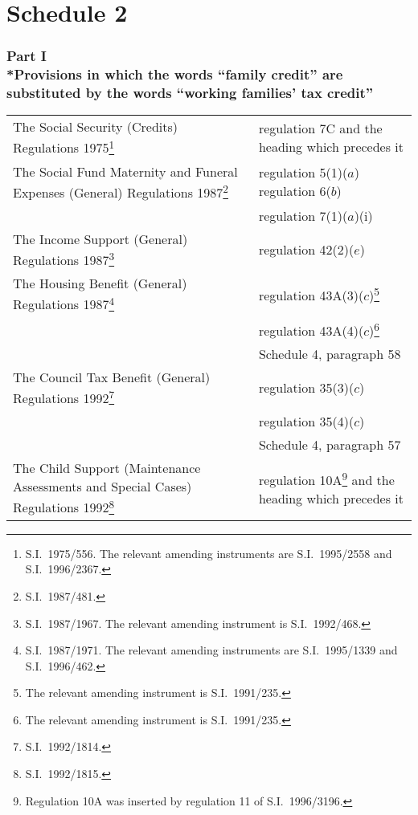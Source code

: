 \documentclass[12pt,a4paper]{article}
\begin{document}
\part{Schedule 2}

\section[Part I --- Provisions in which the words “family credit” are substituted by the words “working families' tax credit”]{\sloppy Part I\\*Provisions in which the words “family credit” are substituted by the words “working families' tax credit”}

\renewcommand\parthead{--- Schedule 2 Part I}

\begin{longtable}{p{234.78296pt}p{131.2158pt}}
\hline
\endhead
\hline
\endlastfoot
The Social Security (Credits) Regulations 1975\footnote{S.I.\ 1975/556. The relevant amending instruments are S.I.\ 1995/2558 and S.I.\ 1996/2367.}	&regulation 7C and the heading which precedes it\\
The Social Fund Maternity and Funeral Expenses (General) Regulations 1987\footnote{S.I.\ 1987/481.}&	regulation 5(1)($a$) \newline 
	regulation 6($b$) \\
	&regulation 7(1)($a$)(i)\\
The Income Support (General) Regulations 1987\footnote{S.I.\ 1987/1967. The relevant amending instrument is S.I.\ 1992/468.}	&regulation 42(2)($e$)\\ 
The Housing Benefit (General) Regulations 1987\footnote{S.I.\ 1987/1971. The relevant amending instruments are S.I.\ 1995/1339 and S.I.\ 1996/462.}	&regulation 43A(3)($c$)\footnote{The relevant amending instrument is S.I.\ 1991/235.}\\
	&regulation 43A(4)($c$)\footnote{The relevant amending instrument is S.I.\ 1991/235.}\\
	&Schedule 4, paragraph 58\\
The Council Tax Benefit (General) Regulations 1992\footnote{S.I.\ 1992/1814.}	&regulation 35(3)($c$) \\
	&regulation 35(4)($c$) \\
\pagebreak[4]
	&Schedule 4, paragraph 57\\
The Child Support (Maintenance Assessments and Special Cases) Regulations 1992\footnote{S.I.\ 1992/1815.}	&regulation 10A\footnote{Regulation 10A was inserted by regulation 11 of S.I.\ 1996/3196.} and the heading which precedes it\\

\end{longtable}
\end{document}
